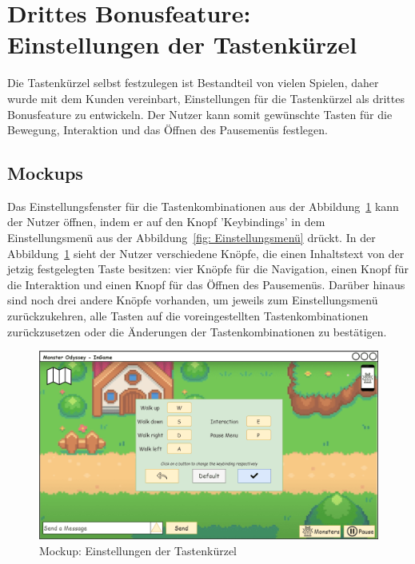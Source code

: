 \section{Drittes Bonusfeature: Einstellungen der Tastenkürzel}\label{sec:keybindings-settings}
Die Tastenkürzel selbst festzulegen ist Bestandteil von vielen Spielen, daher wurde mit dem Kunden vereinbart, Einstellungen für die Tastenkürzel als drittes Bonusfeature zu entwickeln. Der Nutzer kann somit gewünschte Tasten für die Bewegung, Interaktion und das Öffnen des Pausemenüs festlegen. 
\subsection{Mockups}\label{subsec:mockups-keybindings-settings}
Das Einstellungsfenster für die Tastenkombinationen aus der Abbildung~\ref{fig: Einstellungen der Tastenkürzel} kann der Nutzer öffnen, indem er auf den Knopf 'Keybindings' in dem Einstellungsmenü aus der Abbildung~\ref{fig: Einstellungsmenü} drückt.
In der Abbildung~\ref{fig: Einstellungen der Tastenkürzel} sieht der Nutzer verschiedene Knöpfe, die einen Inhaltstext von der jetzig festgelegten Taste besitzen: vier Knöpfe für die Navigation, einen Knopf für die Interaktion und einen Knopf für das Öffnen des Pausemenüs. Darüber hinaus sind noch drei andere Knöpfe vorhanden, um jeweils zum Einstellungsmenü zurückzukehren, alle Tasten auf die voreingestellten Tastenkombinationen zurückzusetzen oder die Änderungen der Tastenkombinationen zu bestätigen.
\begin{figure}[H]
    \center
    \includegraphics[scale=\scale]{images/mockups/Bonusfeatures/Keybindings/KeybindingsSettings.png}
    \caption{Mockup: Einstellungen der Tastenkürzel}
    \label{fig: Einstellungen der Tastenkürzel}
\end{figure}
